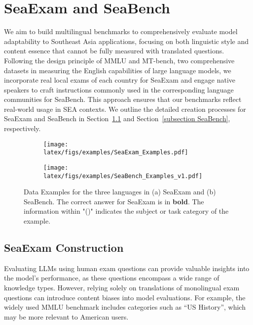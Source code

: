 \section{SeaExam and SeaBench}

We aim to build multilingual benchmarks to comprehensively evaluate model adaptability to Southeast Asia applications, focusing on both linguistic style and content essence that cannot be fully measured with translated questions.
Following the design principle of MMLU and MT-bench, two comprehensive datasets in measuring the English capabilities of large language models, we incorporate real local exams of each country for SeaExam and engage native speakers to craft instructions commonly used in the corresponding language communities for SeaBench. 
This approach ensures that our benchmarks reflect real-world usage in SEA contexts. We outline the detailed creation processes for SeaExam and SeaBench in Section~\ref{subsection SeaExam} and Section~\ref{subsection SeaBench}, respectively.


\begin{figure*}[!ht]
    \centering
    \begin{subfigure}[b]{0.98\textwidth}
        \centering
        \texttt{[image: latex/figs/examples/SeaExam\_Examples.pdf]}
        \caption{}
        \label{subfig:seaexam_example}
    \end{subfigure}
    \begin{subfigure}[b]{0.98\textwidth}
        \centering
        \texttt{[image: latex/figs/examples/SeaBench\_Examples\_v1.pdf]}
        \caption{}
        \label{subfig:seabench_example}
    \end{subfigure}
    \caption{Data Examples for the three languages in (a) SeaExam and (b) SeaBench. The correct answer for SeaExam is in \textbf{bold}. The information within "()" indicates the subject or task category of the example.}
    \label{fig:seaexam_examples}
\end{figure*}


\subsection{SeaExam Construction} \label{subsection SeaExam}
Evaluating LLMs using human exam questions can provide valuable insights into the model's performance, as these questions encompass a wide range of knowledge types.
However, relying solely on translations of monolingual exam questions can introduce content biases into model evaluations. For example, the widely used MMLU benchmark includes categories such as ``US History'', which may be more relevant to American users. 


